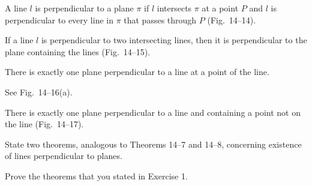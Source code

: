 \documentclass[11pt]{book}
\begin{document}
\FIGXIVTHIRTEENFOURTEEN

\begin{definition}
A line $l$ is perpendicular to a plane $\pi$ if $l$ intersects $\pi$ at a point
$P$ and $l$ is perpendicular to every line in $\pi$ that passes through $P$
(Fig.~14--14).
\end{definition}

\begin{theorem}
If a line $l$ is perpendicular to two intersecting lines, then it is
perpendicular to the plane containing the lines (Fig.~14--15).
\end{theorem}


\FIGXIVFIFTEENSIXTEEN

\begin{theorem}
There is exactly one plane perpendicular to a line at a point of the line.
\end{theorem}

\noindent See Fig.~14--16(a).

\noindent[\emph{Hint:} Use the previous theorem to show that there is at least
one plane. To prove there is only one, it is sufficient to show that if $l_1$,
$l_2$, and $l_3$ in Fig.~14--16(b) are distinct lines perpendicular to $l$ at
$P$, then they are in a single plane. Thus, the plane of $l_2$ and $l_3$ meets
the plane of $l$ and $l_1$ in a line $l' \perp l$. Since there is only one line
in the plane of $l$ and $l_1$ perpendicular to $l$ at $P$, we have $l_1 = l'$.
Hence $l_1$, $l_2$, and $l_3$ are coplanar.]

\begin{theorem}
There is exactly one plane perpendicular to a line and containing a point not on
the line (Fig.~14--17).
\end{theorem}

\begin{exercisecols}
\begin{exlist}
\item State two theorems, analogous to Theorems 14--7 and 14--8, concerning
      existence of lines perpendicular to planes.
\item Prove the theorems that you stated in Exercise 1.
\end{exlist}
\end{exercisecols}
\end{document}
